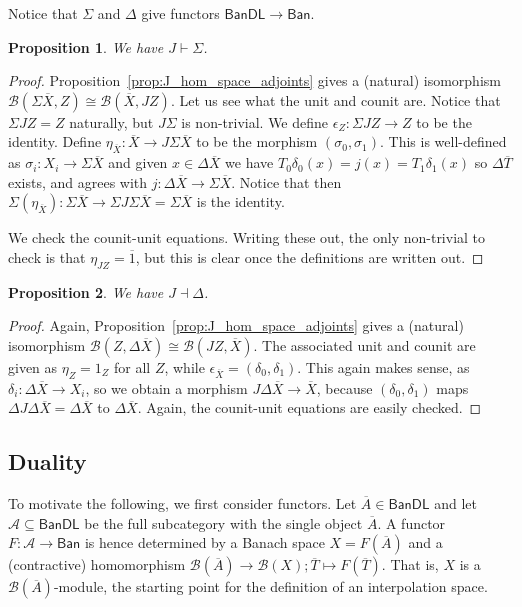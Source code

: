\documentclass[a4paper,11pt]{article}
\theoremstyle{plain}
\newtheorem{proposition}{Proposition}[section]
\theoremstyle{remark}
\newcommand{\mc}[1]{\mathcal{#1}}
\newcommand{\msf}[1]{\mathsf{#1}}
\begin{document}
Notice that $\Sigma$ and $\Delta$ give functors $\msf{BanDL} \to \msf{Ban}$.

\begin{proposition}
We have $J \vdash \Sigma$.
\end{proposition}
\begin{proof}
Proposition~\ref{prop:J_hom_space_adjoints} gives a (natural) isomorphism $\mc B(\Sigma\overline X, Z) \cong \mc B(\overline X, JZ)$.  Let us see what the unit and counit are.  Notice that $\Sigma JZ = Z$ naturally, but $J\Sigma$ is non-trivial.  We define $\epsilon_Z \colon \Sigma JZ \to Z$ to be the identity.  Define $\eta_{\overline X} \colon \overline X \to J\Sigma\overline X$ to be the morphism $(\sigma_0, \sigma_1)$.  This is well-defined as $\sigma_i \colon X_i \to \Sigma\overline X$ and given $x\in\Delta\overline X$ we have $T_0\delta_0(x) = j(x) = T_1\delta_1(x)$ so $\Delta\overline T$ exists, and agrees with $j\colon \Delta\overline X \to \Sigma\overline X$.  Notice that then $\Sigma(\eta_{\overline X}) \colon \Sigma\overline X \to \Sigma J\Sigma \overline X = \Sigma\overline X$ is the identity.

We check the counit-unit equations.  Writing these out, the only non-trivial to check is that $\eta_{JZ} = \overline{1}$, but this is clear once the definitions are written out.
\end{proof}

\begin{proposition}
We have $J \dashv \Delta$.
\end{proposition}
\begin{proof}
Again, Proposition~\ref{prop:J_hom_space_adjoints} gives a (natural) isomorphism $\mc B(Z, \Delta\overline X) \cong \mc B(JZ, \overline X)$.  The associated unit and counit are given as
$\eta_Z = 1_Z$ for all $Z$, while $\epsilon_{\overline X} = (\delta_0, \delta_1)$.  This again makes sense, as $\delta_i \colon \Delta\overline X \to X_i$, so we obtain a morphism $J\Delta\overline X \to \overline X$, because $(\delta_0, \delta_1)$ maps $\Delta J\Delta\overline X = \Delta\overline X$ to $\Delta\overline X$.  Again, the counit-unit equations are easily checked.
\end{proof}




\subsection{Duality}

To motivate the following, we first consider functors.  Let $\overline A \in \msf{BanDL}$ and let $\mc A \subseteq \msf{BanDL}$ be the full subcategory with the single object $\overline A$.  A functor $F \colon \mc A \to \msf{Ban}$ is hence determined by a Banach space $X = F(\overline A)$ and a (contractive) homomorphism $\mc B(\overline A) \to \mc B(X); \overline T \mapsto F(\overline T)$.  That is, $X$ is a $\mc B(\overline A)$-module, the starting point for the definition of an interpolation space.
\end{document}
